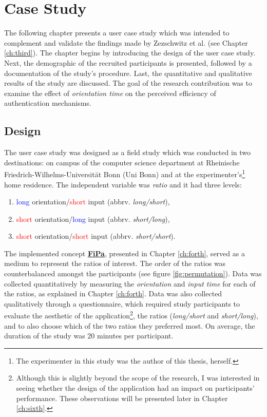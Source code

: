 
\chapter{Case Study}\label{ch:fifth}

The following chapter presents a user case study which was intended to complement and validate the findings made by Zezschwitz et al. \cite{Zezschwitz} (see Chapter \ref{ch:third}). The chapter begins by introducing the design of the user case study. Next, the demographic of the recruited participants is presented, followed by a documentation of the study's procedure. Last, the quantitative and qualitative results of the study are discussed. The goal of the research contribution was to examine the effect of \textit{orientation time} on the perceived efficiency of authentication mechanisms. 

\section{Design} \label{5.1}

The user case study was designed as a field study which was conducted in two destinations: on campus of the computer science department at Rheinische Friedrich-Wilhelms-Universit{\"a}t Bonn (Uni Bonn) and at the experimenter's\footnote{The experimenter in this study was the author of this thesis, herself.} home residence. The independent variable was \textit{ratio} and it had three levels:
\begin{enumerate}
    \item \textcolor{blue}{long} orientation/\textcolor{red}{short} input (abbrv. \textit{long/short}), 
    \item \textcolor{red}{short} orientation/\textcolor{blue}{long} input (abbrv. \textit{short/long}), 
    \item \textcolor{red}{short} orientation/\textcolor{red}{short} input (abbrv. \textit{short/short}). 
\end{enumerate}

The implemented concept \underline{\textbf{FiPa}}, presented in Chapter \ref{ch:forth}, served as a medium to represent the ratios of interest. The order of the ratios was counterbalanced amongst the participants (see figure \ref{fig:permutation}). Data was collected quantitatively by measuring the \textit{orientation} and \textit{input time} for each of the ratios, as explained in Chapter \ref{ch:forth}. Data was also collected qualitatively through a questionnaire, which required study participants to evaluate the aesthetic of the application\footnote{Although this is slightly beyond the scope of the research, I was interested in seeing whether the design of the application had an impact on participants' performance. These observations will be presented later in Chapter \ref{ch:sixth}.}, the ratios (\textit{long/short} and \textit{short/long}), and to also choose which of the two ratios they preferred most. On average, the duration of the study was 20 minutes per participant. 

